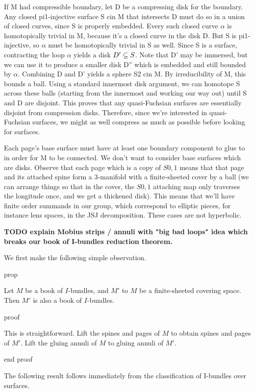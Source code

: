 If M had compressible boundary, let D be a compressing disk for the boundary.
Any closed pi1-injective surface S cin M that intersects D must do so in
a union of closed curves, since S is properly embedded. Every such closed curve
$\alpha$ is homotopically trivial in M, because it's a closed curve in the disk
D.  But S is pi1-injective, so $\alpha$ must be homotopically trivial in S as
well. Since S is a surface, contracting the loop $\alpha$ yields a disk $D'\subseteq
S$. Note that D' may be immersed, but we can use it to produce a smaller disk
D'' which is embedded and still bounded by $\alpha$. Combining D and D' yields
a sphere S2 cin M. By irreducibility of M, this bounds a ball. Using a standard
innermost disk argument, we can homotope S across these balls (starting from
the innermost and working our way out) until S and D are disjoint.  This proves
that any quasi-Fuchsian surfaces are essentially disjoint from compression
disks. Therefore, since we're interested in quasi-Fuchsian surfaces, we might
as well compress as much as possible before looking for surfaces.

Each page's base surface must have at least one boundary component to glue to
in order for M to be connected. We don't want to consider base surfaces which
are disks.  Observe that each page which is a copy of $S0,1$ means that that
page and its attached spine form a 3-manifold with a finite-sheeted cover by
a ball (we can arrange things so that in the cover, the $S0,1$ attaching map
only traverses the longitude once, and we get a thickened disk).  This means
that we'll have finite order summands in our group, which correspond to
elliptic pieces, for instance lens spaces, in the JSJ decomposition. These
cases are not hyperbolic.

\textbf{TODO explain Mobius strips / annuli with "big bad loops" idea which
breaks our book of I-bundles reduction theorem.}

We first make the following simple observation.

prop

Let $M$ be a book of $I$-bundles, and $M'$ to $M$ be a finite-sheeted covering
space.  Then $M'$ is also a book of $I$-bundles.

proof

This is straightforward. Lift the spines and pages of $M$ to obtain spines and
pages of $M'$. Lift the gluing annuli of $M$ to gluing annuli of $M'$.

end proof

The following result follows immediately from the classification of I-bundles
over surfaces.

